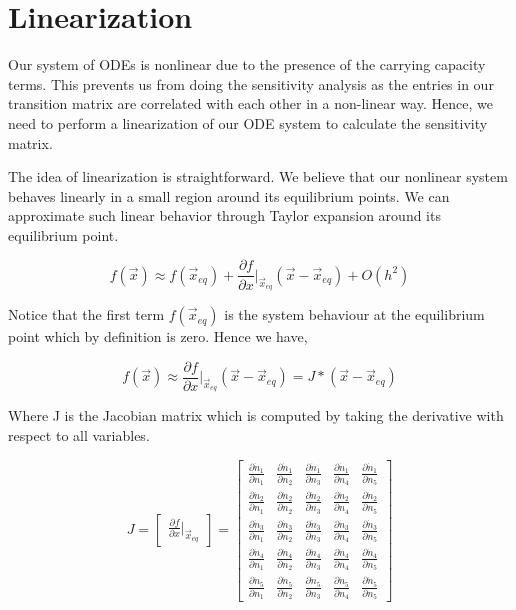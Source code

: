 \section{Linearization}

Our system of ODEs is nonlinear due to the presence of the carrying capacity terms. This prevents us from doing the sensitivity analysis as the entries in our transition matrix are correlated with each other in a non-linear way. Hence, we need to perform a linearization of our ODE system to calculate the sensitivity matrix.

The idea of linearization is straightforward. We believe that our nonlinear system behaves linearly in a small region around its equilibrium points. We can approximate such linear behavior through Taylor expansion around its equilibrium point.

\begin{equation}
f(\Vec{x}) \approx f(\Vec{x}_{eq}) + \frac{\partial f}{\partial x}\bigg|_{\Vec{x}_{eq}}(\Vec{x}-\Vec{x}_{eq})+O(h^2)
\end{equation}

Notice that the first term $f(\Vec{x}_{eq})$ is the system behaviour at the equilibrium point which by definition is zero. Hence we have,

\begin{equation}
f(\Vec{x}) \approx \frac{\partial f}{\partial x}\bigg|_{\Vec{x}_{eq}}(\Vec{x}-\Vec{x}_{eq}) = J*(\Vec{x}-\Vec{x}_{eq})
\end{equation}

Where J is the Jacobian matrix which is computed by taking the derivative with respect to all variables.

\begin{equation}
\renewcommand{\arraystretch}{1.5}
J = \begin{bmatrix}
\frac{\partial f}{\partial x}\bigg|_{\Vec{x}_{eq}}
\end{bmatrix}
= \begin{bmatrix}
\frac{\partial\dot{n}_1}{\partial n_1} & \frac{\partial\dot{n}_1}{\partial n_2} & \frac{\partial\dot{n}_1}{\partial n_3} & \frac{\partial\dot{n}_1}{\partial n_4} & \frac{\partial\dot{n}_1}{\partial n_5} \\
\frac{\partial\dot{n}_2}{\partial n_1} & \frac{\partial\dot{n}_2}{\partial n_2} & \frac{\partial\dot{n}_2}{\partial n_3} & \frac{\partial\dot{n}_2}{\partial n_4} & \frac{\partial\dot{n}_2}{\partial n_5} \\
\frac{\partial\dot{n}_3}{\partial n_1} & \frac{\partial\dot{n}_3}{\partial n_2} & \frac{\partial\dot{n}_3}{\partial n_3} & \frac{\partial\dot{n}_3}{\partial n_4} & \frac{\partial\dot{n}_3}{\partial n_5} \\
\frac{\partial\dot{n}_4}{\partial n_1} & \frac{\partial\dot{n}_4}{\partial n_2} & \frac{\partial\dot{n}_4}{\partial n_3} & \frac{\partial\dot{n}_4}{\partial n_4} & \frac{\partial\dot{n}_4}{\partial n_5} \\
\frac{\partial\dot{n}_5}{\partial n_1} & \frac{\partial\dot{n}_5}{\partial n_2} & \frac{\partial\dot{n}_5}{\partial n_3} & \frac{\partial\dot{n}_5}{\partial n_4} & \frac{\partial\dot{n}_5}{\partial n_5}
\end{bmatrix}
\end{equation}

